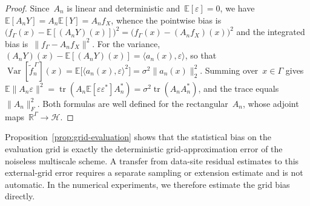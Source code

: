 \documentclass[12pt]{article}
\newcommand{\E}{{\mathbb{E}}}
\newcommand{\R}{\mathbb{R}}
\DeclareMathOperator{\var}{Var}
\begin{document}
\begin{proof}
Since~$A_n$ is linear and deterministic and~$\E[\varepsilon]=0$, we have $\E[A_nY]=A_n\E[Y]=A_nf_X$, whence the pointwise bias is~$\big(f_\Gamma(x)-\E[(A_nY)(x)]\big)^2=\big(f_\Gamma(x)-(A_nf_X)(x)\big)^2$ and the integrated bias is~$\|f_\Gamma-A_nf_X\|^2$. For the variance, $(A_nY)(x)-\E[(A_nY)(x)]=\langle a_n(x),\varepsilon\rangle$, so that $\var[\widetilde f_n^{\,\Gamma}](x)=\E\big[\langle a_n(x),\varepsilon\rangle^2\big]=\sigma^2\|a_n(x)\|_2^2$. Summing over~$x\in\Gamma$ gives $\E\|A_n\varepsilon\|^2=\operatorname{tr}(A_n\E[\varepsilon\varepsilon^*]A_n^*)=\sigma^2\operatorname{tr}(A_nA_n^*)$, and the trace equals~$\|A_n\|_F^2$. Both formulas are well defined for the rectangular~$A_n$, whose adjoint maps~$\R^{\Gamma}\to\mathcal H$.
\end{proof}

Proposition~\ref{prop:grid-evaluation} shows that the statistical bias on the evaluation grid is exactly the deterministic grid-approximation error of the noiseless multiscale scheme. A transfer from data-site residual estimates to this external-grid error requires a separate sampling or extension estimate and is not automatic. In the numerical experiments, we therefore estimate the grid bias directly.
\end{document}
